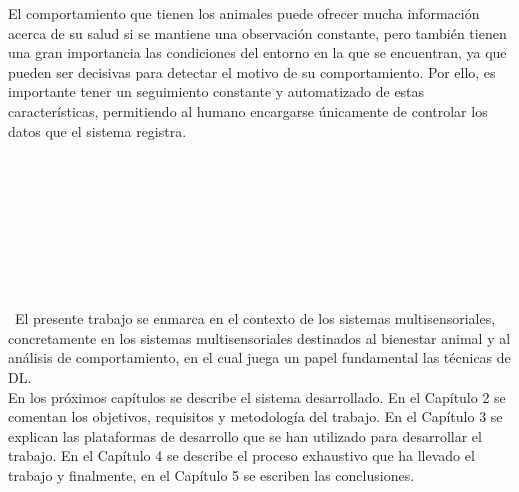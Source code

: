 El comportamiento que tienen los animales puede ofrecer mucha información acerca de su salud si se mantiene una observación constante, pero también tienen una gran importancia las condiciones del entorno en la que se encuentran, ya que pueden ser decisivas para detectar el motivo de su comportamiento. Por ello, es importante tener un seguimiento constante y automatizado de estas características, permitiendo al humano encargarse únicamente de controlar los datos que el sistema registra.\\
\

\

\

\

\

\
El presente trabajo se enmarca en el contexto de los sistemas multisensoriales, concretamente en los sistemas multisensoriales destinados al bienestar animal y al análisis de comportamiento, en el cual juega un papel fundamental las técnicas de DL.\\

En los próximos capítulos se describe el sistema desarrollado. En el Capítulo 2 se comentan los objetivos, requisitos y metodología del trabajo. En el Capítulo 3 se explican las plataformas de desarrollo que se han utilizado para desarrollar el trabajo. En el Capítulo 4 se describe el proceso exhaustivo que ha llevado el trabajo y finalmente, en el Capítulo 5 se escriben las conclusiones.